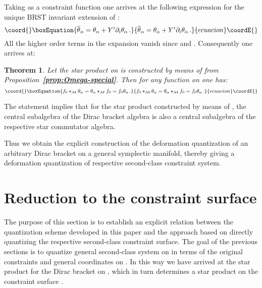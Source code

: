 \documentclass[a4paper,11pt]{amsart}
\newtheorem{thm}{Theorem}
\numberwithin{thm}{section} %
\numberwithin{equation}{section} %
\numberwithin{figure}{section} %
\providecommand{\bref}[1]{{\bf \ref{#1}}}
\renewcommand{\:}{{\rm\, :\,}}
\def\bar{\overline}
\def\d{\partial}
\def\manM{{\mathcal M}}
\def\con{{\bar\Gamma}}
\begin{document}
Taking as \coordHE{} a constraint function \myHighlight{$\theta_\alpha$}\coordHE{} one arrives at
the following expression for the unique BRST invariant extension
\myHighlight{${\bar\theta}_\alpha$}\coordHE{} of \myHighlight{$\theta_\alpha$}\coordHE{}:
\begin{equation}\coord{}\boxEquation{
  {\bar\theta}_{\alpha}=\theta_\alpha+Y^i\d_i\theta_\alpha\,.
}{
  {\bar\theta}_{\alpha}=\theta_\alpha+Y^i\d_i\theta_\alpha\,.
}{ecuacion}\coordE{}\end{equation}
All the higher order terms in the expansion vanish
since \myHighlight{$D^{ij}\d_j\theta_\alpha=0$}\coordHE{} and
\myHighlight{$\d_j\d_i\theta_\alpha-(\con^0)^k_{ij}\d_k\theta_\alpha=0$}\coordHE{}. 
Consequently one arrives at:
\begin{thm}
Let the star product \myHighlight{$\star_\manM$}\coordHE{} on \myHighlight{$\manM$}\coordHE{} is constructed by means of
\coordHE{} from Proposition~\bref{prop:Omega-special}. Then
for any function \coordHE{} on \myHighlight{$\manM$}\coordHE{} one has:
\begin{equation}\coord{}\boxEquation{
f_0\star_\manM \theta_\alpha=
 \theta_\alpha \star_\manM f_0=
f_0\theta_\alpha\,.
}{
f_0\star_\manM \theta_\alpha=
 \theta_\alpha \star_\manM f_0=
f_0\theta_\alpha\,.
}{ecuacion}\coordE{}\end{equation}
\end{thm}
The statement implies that for the star product
constructed by means of \coordHE{}, the central subalgebra
of the Dirac bracket algebra is also a central subalgebra
of the respective star commutator algebra.

Thus we obtain the explicit construction of the deformation quantization
of an arbitrary Dirac bracket on a general symplectic manifold,
thereby giving a deformation quantization of respective second-class
constraint system.


\section{Reduction to the constraint surface}\label{sec:reduction}
The purpose of this section is to establish an explicit relation
between the quantization scheme developed in this paper and
the approach based on directly quantizing the respective
second-class constraint surface.  The goal of the previous sections is
to quantize general second-class system on \myHighlight{$\manM$}\coordHE{} in terms of
the original constraints \myHighlight{$\theta_\alpha$}\coordHE{} and general coordinates on
\myHighlight{$\manM$}\coordHE{}.  In this way we have arrived at the star product for the
Dirac bracket on \myHighlight{$\manM$}\coordHE{}, which in turn determines a star product on
the constraint surface \myHighlight{$\Sigma$}\coordHE{}.
\end{document}
